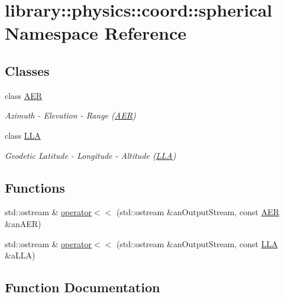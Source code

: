 \hypertarget{namespacelibrary_1_1physics_1_1coord_1_1spherical}{}\section{library\+:\+:physics\+:\+:coord\+:\+:spherical Namespace Reference}
\label{namespacelibrary_1_1physics_1_1coord_1_1spherical}
\subsection*{Classes}
\begin{DoxyCompactItemize}
\item 
class \hyperlink{classlibrary_1_1physics_1_1coord_1_1spherical_1_1_a_e_r}{A\+ER}
\begin{DoxyCompactList}\small\item\em Azimuth -\/ Elevation -\/ Range (\hyperlink{classlibrary_1_1physics_1_1coord_1_1spherical_1_1_a_e_r}{A\+ER}) \end{DoxyCompactList}\item 
class \hyperlink{classlibrary_1_1physics_1_1coord_1_1spherical_1_1_l_l_a}{L\+LA}
\begin{DoxyCompactList}\small\item\em Geodetic Latitude -\/ Longitude -\/ Altitude (\hyperlink{classlibrary_1_1physics_1_1coord_1_1spherical_1_1_l_l_a}{L\+LA}) \end{DoxyCompactList}\end{DoxyCompactItemize}
\subsection*{Functions}
\begin{DoxyCompactItemize}
\item 
std\+::ostream \& \hyperlink{namespacelibrary_1_1physics_1_1coord_1_1spherical_a329c02f24427c714fd34c3ea372f7c95}{operator$<$$<$} (std\+::ostream \&an\+Output\+Stream, const \hyperlink{classlibrary_1_1physics_1_1coord_1_1spherical_1_1_a_e_r}{A\+ER} \&an\+A\+ER)
\item 
std\+::ostream \& \hyperlink{namespacelibrary_1_1physics_1_1coord_1_1spherical_ae657b9eb35f35ee5db9f1a50e64f77a5}{operator$<$$<$} (std\+::ostream \&an\+Output\+Stream, const \hyperlink{classlibrary_1_1physics_1_1coord_1_1spherical_1_1_l_l_a}{L\+LA} \&a\+L\+LA)
\end{DoxyCompactItemize}


\subsection{Function Documentation}
\mbox{\label{namespacelibrary_1_1physics_1_1coord_1_1spherical_ae657b9eb35f35ee5db9f1a50e64f77a5}} 
